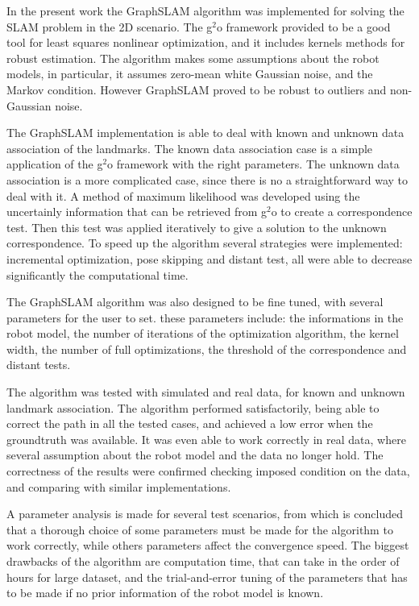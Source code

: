 \begin{conclusion}
\label{chap:conclusion}

In the present work the GraphSLAM algorithm was implemented for solving the SLAM problem in the 2D scenario. The g$^2$o framework provided to be a good tool for least squares nonlinear optimization, and it includes kernels methods for robust estimation. The algorithm makes some assumptions about the robot models, in particular, it assumes zero-mean white Gaussian noise, and the Markov condition. However GraphSLAM proved to be robust to outliers and non-Gaussian noise.

The GraphSLAM implementation is able to deal with known and unknown data association of the landmarks. The known data association case is a simple application of the g$^2$o framework with the right parameters. The unknown data association is a more complicated case, since there is no a straightforward way to deal with it. A method of maximum likelihood was developed using the uncertainly information that can be retrieved from g$^2$o to create a correspondence test. Then this test was applied iteratively to give a solution to the unknown correspondence. To speed up the algorithm several strategies were implemented: incremental optimization, pose skipping and distant test, all were able to decrease significantly the computational time.

The GraphSLAM algorithm was also designed to be fine tuned, with several parameters for the user to set. these parameters include: the informations in the robot model, the number of iterations of the optimization algorithm, the kernel width, the number of full optimizations, the threshold of the correspondence and distant tests. 

The algorithm was tested with simulated and real data, for known and unknown landmark association. The algorithm performed satisfactorily, being able to correct the path in all the tested cases, and achieved a low error when the groundtruth was available. It was even able to work correctly in real data, where several assumption about the robot model and the data no longer hold. The correctness of the results were confirmed checking imposed condition on the data, and comparing with similar implementations. 

A parameter analysis is made for several test scenarios, from which is concluded that a thorough choice of some parameters must be made for the algorithm to work correctly, while others parameters affect the convergence speed. The biggest drawbacks of the algorithm are computation time, that can take in the order of hours for large dataset, and the trial-and-error tuning of the parameters that has to be made if no prior information of the robot model is known. 


\end{conclusion}

